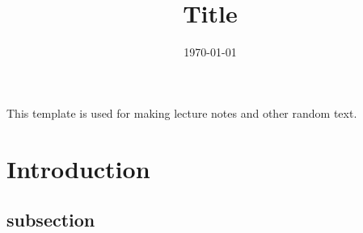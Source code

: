 \documentclass[11pt,a4paper]{article}
\title{ Title}
\author{ }
\date{\today}
\begin{document}
\maketitle

This template is used for making lecture notes and other random text.
\section{Introduction}
\subsection{subsection}


\newpage


\end{document}
